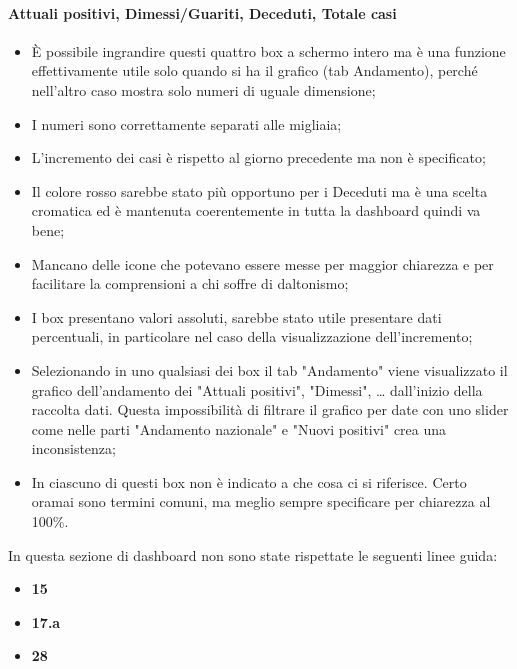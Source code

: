 \paragraph{Attuali positivi, Dimessi/Guariti, Deceduti, Totale casi}
\begin{itemize}
    \item \`E possibile ingrandire questi quattro box a schermo intero ma è una funzione effettivamente utile solo quando si ha il grafico (tab Andamento), perché nell'altro caso mostra solo numeri di uguale dimensione;
    \item I numeri sono correttamente separati alle migliaia;
    \item L'incremento dei casi è rispetto al giorno precedente ma non è specificato;
    \item Il colore rosso sarebbe stato più opportuno per i Deceduti ma è una scelta cromatica ed è mantenuta coerentemente in tutta la dashboard quindi va bene;
    \item Mancano delle icone che potevano essere messe per maggior chiarezza e per facilitare la comprensioni a chi soffre di daltonismo;
    \item I box presentano valori assoluti, sarebbe stato utile presentare dati percentuali, in particolare nel caso della visualizzazione dell'incremento;
    \item Selezionando in uno qualsiasi dei box il tab "Andamento" viene visualizzato il grafico dell'andamento dei "Attuali positivi", "Dimessi", … dall'inizio della raccolta dati. Questa impossibilità di filtrare il grafico per date con uno slider come nelle parti "Andamento nazionale" e "Nuovi positivi" crea una inconsistenza;
    \item In ciascuno di questi box non è indicato a che cosa ci si riferisce. Certo oramai sono termini comuni, ma meglio sempre specificare per chiarezza al 100\%.
\end{itemize}
In questa sezione di dashboard non sono state rispettate le seguenti linee guida:
\begin{itemize}
    \item \textbf{15}
    \item \textbf{17.a}
    \item \textbf{28}
\end{itemize}

